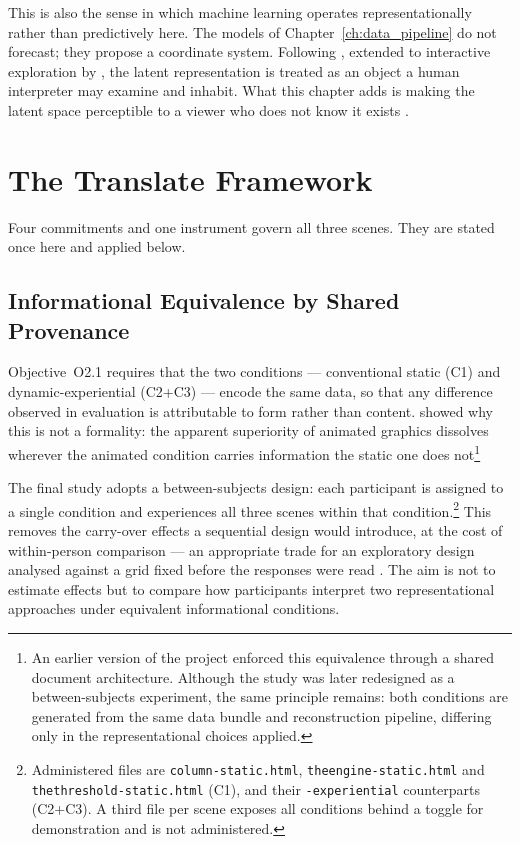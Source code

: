 This is also the sense in which machine learning operates representationally rather than predictively here. The models of Chapter~\ref{ch:data_pipeline} do not forecast; they propose a coordinate system. Following \textcite{iten2020}, extended to interactive exploration by \textcite{camps2019}, the latent representation is treated as an object a human interpreter may examine and inhabit. What this chapter adds is making the latent space perceptible to a viewer who does not know it exists \parencite{sacha2018}.

\section{The Translate Framework}
\label{sec:translate-framework}

Four commitments and one instrument govern all three scenes. They are stated once here and applied below.

\subsection{Informational Equivalence by Shared Provenance}
\label{subsec:equivalence}

Objective~O2.1 requires that the two conditions --- conventional static (C1) and dynamic-experiential (C2+C3) --- encode the same data, so that any difference observed in evaluation is attributable to form rather than content. \textcite{tversky2002} showed why this is not a formality: the apparent superiority of animated graphics dissolves wherever the animated condition carries information the static one does not\footnote{An earlier version of the project enforced this equivalence through a shared document architecture. Although the study was later redesigned as a between-subjects experiment, the same principle remains: both conditions are generated from the same data bundle and reconstruction pipeline, differing only in the representational choices applied.}

The final study adopts a between-subjects design: each participant is assigned to a single condition and experiences all three scenes within that condition.\footnote{Administered files are \texttt{column-static.html}, \texttt{theengine-static.html} and \texttt{thethreshold-static.html} (C1), and their \texttt{-experiential} counterparts (C2+C3). A third file per scene exposes all conditions behind a toggle for demonstration and is not administered.} This removes the carry-over effects a sequential design would introduce, at the cost of within-person comparison --- an appropriate trade for an exploratory design analysed against a grid fixed before the responses were read \parencite{braunclarke2019}. The aim is not to estimate effects but to compare how participants interpret two representational approaches under equivalent informational conditions.

